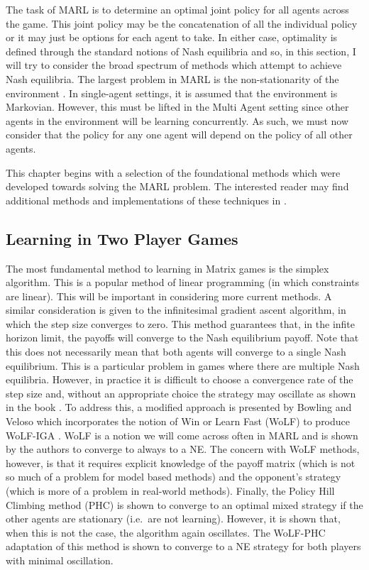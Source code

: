 \documentclass[.../main.tex]{subfiles}
\begin{document}
The task of MARL is to determine an optimal joint policy for all
agents across the game. This joint policy may be the concatenation of
all the individual policy or it may just be options for each agent to
take. In either case, optimality is defined through the standard
notions of Nash equilibria and so, in this section, I will try to
consider the broad spectrum of methods which attempt to achieve
Nash equilibria. The largest problem in MARL is the non-stationarity
of the environment \cite{Hernandez-LealA}. In single-agent settings,
it is assumed that the environment is Markovian.  However, this must
be lifted in the Multi Agent setting since other agents in the
environment will be learning concurrently. As such, we must now
consider that the policy for any one agent will depend on the policy
of all other agents.

This chapter begins with a selection of the foundational methods which
were developed towards solving the MARL problem. The interested reader
may find additional methods and implementations of these techniques in
\cite{SchwartzMulti-agentApproach}.

\subsection{Learning in Two Player Games} \label{sec::Two_Player_Games}

The most fundamental method to learning in Matrix games is the simplex
algorithm. This is a popular method of linear programming (in which
constraints are linear). This will be important in considering more
current methods. A similar consideration is given to the infinitesimal
gradient ascent algorithm, in which the step size converges to
zero. This method guarantees that, in the infite horizon limit, the
payoffs will converge to the Nash equilibrium payoff. Note that this
does not necessarily mean that both agents will converge to a single
Nash equilibrium. This is a particular problem in games where there
are multiple Nash equilibria. However, in practice it is difficult to
choose a convergence rate of the step size and, without an appropriate
choice the strategy may oscillate as shown in the book . To address
this, a modified approach is presented by Bowling and Veloso which
incorporates the notion of Win or Learn Fast (WoLF) to produce
WoLF-IGA \cite{Bowling2002}.  WoLF is a notion we will come across
often in MARL and is shown by the authors to converge to always to a
NE. The concern with WoLF methods, however, is that it requires
explicit knowledge of the payoff matrix (which is not so much of a
problem for model based methods) and the opponent's strategy (which is
more of a problem in real-world methods). Finally, the Policy Hill
Climbing method (PHC) is shown to converge to an optimal mixed
strategy if the other agents are stationary (i.e.~are not
learning). However, it is shown that, when this is not the case, the
algorithm again oscillates. The WoLF-PHC adaptation of this method is
shown to converge to a NE strategy for both players with minimal
oscillation.
\end{document}
